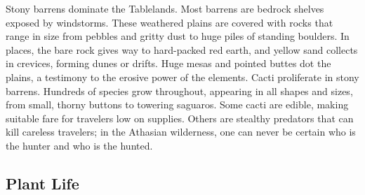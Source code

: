\begin{multicols}{2}
Stony barrens dominate the Tablelands. Most barrens are bedrock shelves exposed
by windstorms. These weathered plains are covered with rocks that range in size
from pebbles and gritty dust to huge piles of standing boulders. In places,
the bare rock gives way to hard-packed red earth, and yellow sand collects in
crevices, forming dunes or drifts. Huge mesas and pointed buttes dot the plains,
a testimony to the erosive power of the elements. Cacti proliferate in stony
barrens. Hundreds of species grow throughout, appearing in all shapes and
sizes, from small, thorny buttons to towering saguaros. Some cacti are edible,
making suitable fare for travelers low on supplies. Others are stealthy
predators that can kill careless travelers; in the Athasian wilderness, one
can never be certain who is the hunter and who is the hunted.

\end{multicols}

\subsection{Plant Life}

